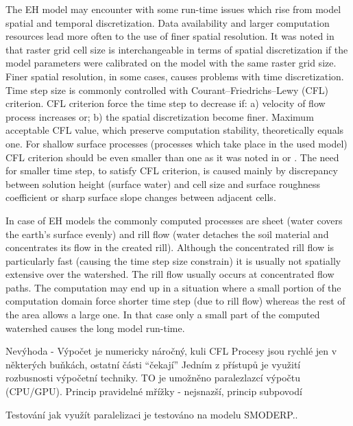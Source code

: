 The EH model may encounter with some run-time issues which 
rise from model spatial and temporal discretization. 
Data availability and larger computation resources lead more often 
to the use of finer spatial resolution. 
It was noted in \cite{molnar2000} that raster grid cell size is interchangeable 
in terms of spatial discretization if the model parameters 
were calibrated on the model with the same raster grid size. 
Finer spatial resolution, in some 
cases, causes problems with time discretization. Time step size is commonly 
controlled with Courant–Friedrichs–Lewy (CFL) criterion. 
CFL criterion force the time step to decrease if: a) velocity of flow 
process increases or; b) the spatial discretization become finer. 
Maximum acceptable CFL value, which preserve computation stability, theoretically equals one. 
For shallow surface processes (processes which take place in the used model)
CFL criterion should 
be even smaller than one as it was noted in \cite{zhang1989}
or \cite{esteves2000}. The need for smaller time step, to satisfy CFL criterion, 
is caused mainly by discrepancy between solution height 
(surface water) and cell size and surface roughness coefficient 
or sharp surface slope changes between adjacent cells. 

In case of EH models the commonly computed processes are sheet (water covers the earth's surface evenly)
and rill flow (water detaches the soil material and concentrates its flow in the created rill). 
Although the concentrated rill flow is particularly fast (causing  
the time step size constrain) it is usually not spatially extensive 
over the watershed. The rill flow usually occurs at concentrated 
flow paths. The computation may end up in a situation where a 
small portion of the computation domain force shorter time step 
(due to rill flow)  whereas the rest of the area allows a large one. 
In that case only a small part of the computed watershed causes the long model run-time. 


Nevýhoda -  Výpočet je numericky náročný, kuli CFL
Procesy jsou rychlé jen v některých buňkách, ostatní části “čekají”
Jedním z přístupů je využití rozbusnosti výpočetní techniky. 
TO je umožněno paralezlazcí výpočtu (CPU/GPU). Princip pravidelné mřížky -  nejsnazší, princip      subpovodí     

Testování jak využít paralelizaci je testováno na modelu SMODERP..
